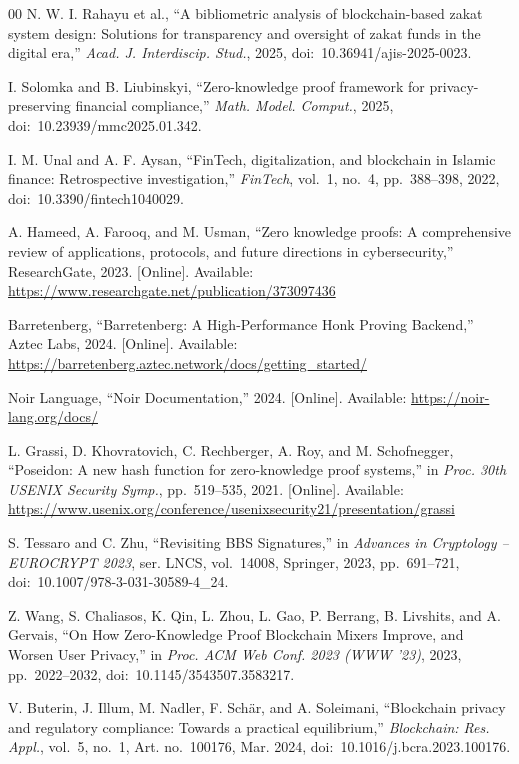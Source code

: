 \documentclass[conference]{IEEEtran}
\begin{document}
\begin{thebibliography}{00}
N. W. I. Rahayu et al., ``A bibliometric analysis of blockchain-based zakat system design: Solutions for transparency and oversight of zakat funds in the digital era,'' \textit{Acad. J. Interdiscip. Stud.}, 2025, doi:~10.36941/ajis-2025-0023.

I. Solomka and B. Liubinskyi, ``Zero-knowledge proof framework for privacy-preserving financial compliance,'' \textit{Math. Model. Comput.}, 2025, doi:~10.23939/mmc2025.01.342.

I. M. Unal and A. F. Aysan, ``FinTech, digitalization, and blockchain in Islamic finance: Retrospective investigation,'' \textit{FinTech}, vol.~1, no.~4, pp.~388--398, 2022, doi:~10.3390/fintech1040029.

A. Hameed, A. Farooq, and M. Usman, ``Zero knowledge proofs: A comprehensive review of applications, protocols, and future directions in cybersecurity,'' ResearchGate, 2023. [Online]. Available: \url{https://www.researchgate.net/publication/373097436}

Barretenberg, ``Barretenberg: A High-Performance Honk Proving Backend,'' Aztec Labs, 2024. [Online]. Available: \url{https://barretenberg.aztec.network/docs/getting_started/}

Noir Language, ``Noir Documentation,'' 2024. [Online]. Available: \url{https://noir-lang.org/docs/}

L. Grassi, D. Khovratovich, C. Rechberger, A. Roy, and M. Schofnegger, ``Poseidon: A new hash function for zero-knowledge proof systems,'' in \textit{Proc. 30th USENIX Security Symp.}, pp.~519--535, 2021. [Online]. Available: \url{https://www.usenix.org/conference/usenixsecurity21/presentation/grassi}

S. Tessaro and C. Zhu, ``Revisiting BBS Signatures,'' in \textit{Advances in Cryptology -- EUROCRYPT 2023}, ser. LNCS, vol.~14008, Springer, 2023, pp.~691--721, doi:~10.1007/978-3-031-30589-4\_24.

Z. Wang, S. Chaliasos, K. Qin, L. Zhou, L. Gao, P. Berrang, B. Livshits, and A. Gervais, ``On How Zero-Knowledge Proof Blockchain Mixers Improve, and Worsen User Privacy,'' in \textit{Proc. ACM Web Conf. 2023 (WWW '23)}, 2023, pp.~2022--2032, doi:~10.1145/3543507.3583217.

V. Buterin, J. Illum, M. Nadler, F. Sch\"{a}r, and A. Soleimani, ``Blockchain privacy and regulatory compliance: Towards a practical equilibrium,'' \textit{Blockchain: Res. Appl.}, vol.~5, no.~1, Art. no.~100176, Mar. 2024, doi:~10.1016/j.bcra.2023.100176.


\end{thebibliography}
\end{document}
